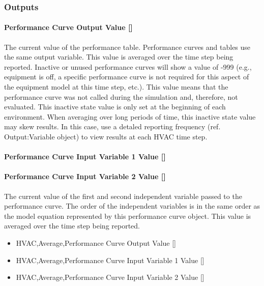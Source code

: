 \subsubsection{Outputs}\label{outputs-1-017}

\paragraph{Performance Curve Output Value {[]}}\label{performance-curve-output-value-1}

The current value of the performance table. Performance curves and tables use the same output variable. This value is averaged over the time step being reported. Inactive or unused performance curves will show a value of -999 (e.g., equipment is off, a specific performance curve is not required for this aspect of the equipment model at this time step, etc.). This value means that the performance curve was not called during the simulation and, therefore, not evaluated. This inactive state value is only set at the beginning of each environment. When averaging over long periods of time, this inactive state value may skew results. In this case, use a detaled reporting frequency (ref. Output:Variable object) to view results at each HVAC time step.

\paragraph{Performance Curve Input Variable 1 Value {[]}}\label{performance-curve-input-variable-1-value-1}

\paragraph{Performance Curve Input Variable 2 Value {[]}}\label{performance-curve-input-variable-2-value}

The current value of the first and second independent variable passed to the performance curve. The order of the independent variables is in the same order as the model equation represented by this performance curve object. This value is averaged over the time step being reported.

\begin{itemize}
\item
  HVAC,Average,Performance Curve Output Value {[]}
\item
  HVAC,Average,Performance Curve Input Variable 1 Value {[]}
\item
  HVAC,Average,Performance Curve Input Variable 2 Value {[]}
\end{itemize}

